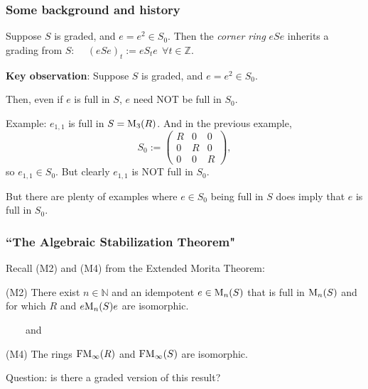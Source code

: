 \documentclass{beamer}
\newcommand{\N}{\mathbb{N}}
\begin{document}
\begin{frame}
\frametitle{Some background and history}

Suppose $S$ is graded, and $e = e^2 \in S_0$.   Then the {\it corner ring} $eSe$ inherits a grading from $S$:  \ \ 
$ (eSe)_t := eS_te \ \ \forall  t\in \mathbb{Z}.$
\pause  

\medskip


{\bf Key observation}:     Suppose $S$ is graded, and $e = e^2 \in S_0$. 

\medskip

Then,   even if $e$ is full in $S$, $e$ need NOT be full in $S_0$.    

\medskip

Example:   $e_{1,1}$ is full in $S = {\rm M}_3(R)$.   And in the previous example, 
$$S_0  :=   \begin{pmatrix}
R & 0 & 0 \\
0  & R & 0 \\
0 &  0 & R
\end{pmatrix},  $$
so $e_{1,1} \in S_0$.   But  clearly   $e_{1,1}$ is NOT full in $S_0$.  

\pause

\medskip

But there are  plenty of examples where $e \in S_0$ being full in $S$ does imply that $e$ is full in $S_0$.  



\end{frame}


\begin{frame}
\frametitle{``The Algebraic Stabilization Theorem"}

Recall (M2) and (M4) from the Extended Morita Theorem:
\bigskip 

(M2)     There exist $n\in \N$ and an idempotent $e \in {\rm M}_n(S)$ that is full in ${\rm M}_n(S)$ and for which  $R$ and $ e{\rm M}_n(S)e$ are isomorphic.

\medskip

\ \ \ \ and

\medskip

(M4)    The rings  ${\rm FM}_\infty(R)$ and ${\rm FM}_\infty(S)$ are isomorphic.     

\bigskip
\bigskip


Question:   is there a graded version of this result?   
\end{frame}
\end{document}
